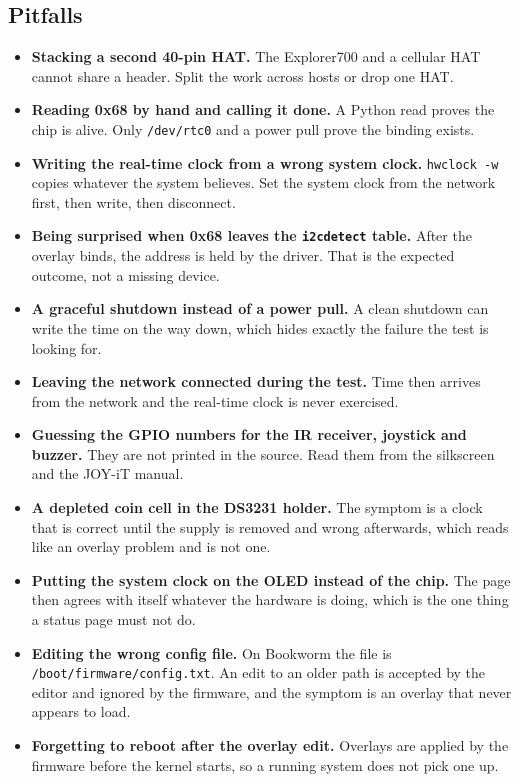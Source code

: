 \subsection*{Pitfalls}

\begin{itemize}
\item \textbf{Stacking a second 40-pin HAT.} The Explorer700 and a cellular HAT cannot share a header. Split the work across hosts or drop one HAT.
\item \textbf{Reading 0x68 by hand and calling it done.} A Python read proves the chip is alive. Only \texttt{/dev/rtc0} and a power pull prove the binding exists.
\item \textbf{Writing the real-time clock from a wrong system clock.} \texttt{hwclock -w} copies whatever the system believes. Set the system clock from the network first, then write, then disconnect.
\item \textbf{Being surprised when 0x68 leaves the \texttt{i2cdetect} table.} After the overlay binds, the address is held by the driver. That is the expected outcome, not a missing device.
\item \textbf{A graceful shutdown instead of a power pull.} A clean shutdown can write the time on the way down, which hides exactly the failure the test is looking for.
\item \textbf{Leaving the network connected during the test.} Time then arrives from the network and the real-time clock is never exercised.
\item \textbf{Guessing the GPIO numbers for the IR receiver, joystick and buzzer.} They are not printed in the source. Read them from the silkscreen and the JOY-iT manual.
\item \textbf{A depleted coin cell in the DS3231 holder.} The symptom is a clock that is correct until the supply is removed and wrong afterwards, which reads like an overlay problem and is not one.
\item \textbf{Putting the system clock on the OLED instead of the chip.} The page then agrees with itself whatever the hardware is doing, which is the one thing a status page must not do.
\item \textbf{Editing the wrong config file.} On Bookworm the file is \texttt{/boot/firmware/config.txt}. An edit to an older path is accepted by the editor and ignored by the firmware, and the symptom is an overlay that never appears to load.
\item \textbf{Forgetting to reboot after the overlay edit.} Overlays are applied by the firmware before the kernel starts, so a running system does not pick one up.
\end{itemize}

